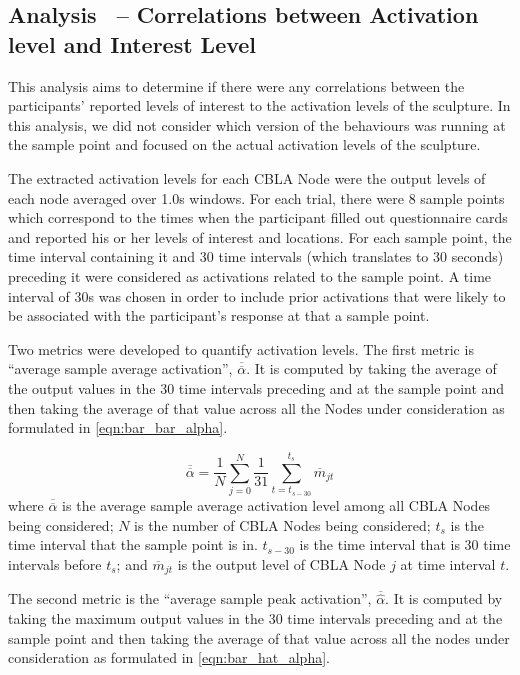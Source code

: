 \subsection{Analysis~ -- Correlations between Activation level and Interest Level} \label{sec:user-study-analysis-activations}

This analysis aims to determine if there were any correlations between the participants' reported levels of interest to the activation levels of the sculpture. In this analysis, we did not consider which version of the behaviours was running at the sample point and focused on the actual activation levels of the sculpture.

The extracted activation levels for each CBLA Node were the output levels of each node averaged over 1.0s windows. For each trial, there were 8 sample points which correspond to the times when the participant filled out questionnaire cards and reported his or her levels of interest and locations. For each sample point, the time interval containing it and 30 time intervals (which translates to 30 seconds) preceding it were considered as activations related to the sample point. A time interval of 30s was chosen in order to include prior activations that were likely to be associated with the participant's response at that a sample point. 

Two metrics were developed to quantify activation levels. The first metric is ``average sample average activation'',  $\overline{\overline{\alpha}}$. It is computed by taking the average of the output values in the 30 time intervals preceding and at the sample point and then taking the average of that value across all the Nodes under consideration as formulated in \eqref{eqn:bar_bar_alpha}.

\begin{equation}\label{eqn:bar_bar_alpha}
	\overline{\overline{\alpha}} = \frac{1}{N}\sum_{j=0}^{N}\frac{1}{31}\sum_{t=t_{s-30}}^{t_{s}}\overline{m}_{jt}
\end{equation}
where $\overline{\overline{\alpha}}$ is the average sample average activation level among all CBLA Nodes being considered; $N$ is the number of CBLA Nodes being considered; $t_s$ is the time interval that the sample point is in. $t_{s-30}$ is the time interval that is 30 time intervals before $t_s$; and $\overline{m}_{jt}$ is the output level of CBLA Node $j$ at time interval $t$. 

The second metric is the ``average sample peak activation'', $\overline{\widehat{\alpha}}$. It is computed by taking the maximum output values in the 30 time intervals preceding and at the sample point and then taking the average of that value across all the nodes under consideration as formulated in \eqref{eqn:bar_hat_alpha}.

